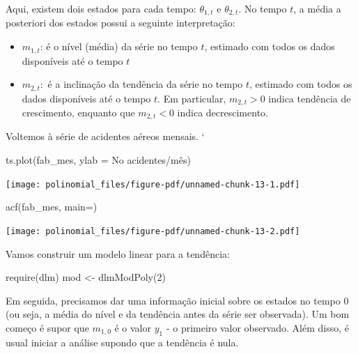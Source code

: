 \documentclass[
  letterpaper,
  DIV=11,
  numbers=noendperiod]{scrreprt}
\newenvironment{Shaded}{\begin{snugshade}}{\end{snugshade}}
\newcommand{\AttributeTok}[1]{\textcolor[rgb]{0.40,0.45,0.13}{#1}}
\newcommand{\DecValTok}[1]{\textcolor[rgb]{0.68,0.00,0.00}{#1}}
\newcommand{\FunctionTok}[1]{\textcolor[rgb]{0.28,0.35,0.67}{#1}}
\newcommand{\NormalTok}[1]{\textcolor[rgb]{0.00,0.23,0.31}{#1}}
\newcommand{\OtherTok}[1]{\textcolor[rgb]{0.00,0.23,0.31}{#1}}
\newcommand{\StringTok}[1]{\textcolor[rgb]{0.13,0.47,0.30}{#1}}
\begin{document}
Aqui, existem dois estados para cada tempo: \(\theta_{1,t}\) e
\(\theta_{2,t}\). No tempo \(t\), a média a posteriori dos estados
possui a seguinte interpretação:

\begin{itemize}
\item
  \(m_{1,t}\): é o nível (média) da série no tempo \(t\), estimado com
  todos os dados disponíveis até o tempo \(t\)
\item
  \(m_{2,t}:\) é a inclinação da tendência da série no tempo \(t\),
  estimado com todos os dados disponíveis até o tempo \(t\). Em
  particular, \(m_{2,t}>0\) indica tendência de crescimento, enquanto
  que \(m_{2,t}<0\) indica decrescimento.
\end{itemize}

Voltemos à série de acidentes aéreos mensais. `

\begin{Shaded}
\begin{Highlighting}[]
\FunctionTok{ts.plot}\NormalTok{(fab\_mes, }\AttributeTok{ylab =} \StringTok{\textquotesingle{}No acidentes/mês\textquotesingle{}}\NormalTok{)}
\end{Highlighting}
\end{Shaded}

\texttt{[image: polinomial\_files/figure-pdf/unnamed-chunk-13-1.pdf]}

\begin{Shaded}
\begin{Highlighting}[]
\FunctionTok{acf}\NormalTok{(fab\_mes, }\AttributeTok{main=}\StringTok{\textquotesingle{}\textquotesingle{}}\NormalTok{)}
\end{Highlighting}
\end{Shaded}

\texttt{[image: polinomial\_files/figure-pdf/unnamed-chunk-13-2.pdf]}

Vamos construir um modelo linear para a tendência:

\begin{Shaded}
\begin{Highlighting}[]
\FunctionTok{require}\NormalTok{(dlm)}
\NormalTok{mod }\OtherTok{\textless{}{-}} \FunctionTok{dlmModPoly}\NormalTok{(}\DecValTok{2}\NormalTok{)}
\end{Highlighting}
\end{Shaded}

Em seguida, precisamos dar uma informação inicial sobre os estados no
tempo \(0\) (ou seja, a média do nível e da tendência antes da série ser
observada). Um bom começo é supor que \(m_{1,0}\) é o valor \(y_1\) - o
primeiro valor observado. Além disso, é usual iniciar a análise supondo
que a tendência é nula.
\end{document}
